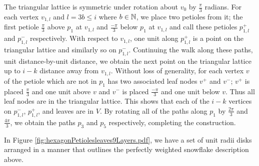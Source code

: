 The triangular lattice is symmetric under rotation about $v_0$ by $\frac{\pi}{3}$ radians.  
For each vertex $v_{1,l}$ and $l = 3 b \leq i$ where $b \in {\mathbb{N}}$, we place two petioles from it; the first petiole $\frac{\pi}{3}$ above $p_1$ at $v_{1,l}$ and $\frac{-\pi}{3}$ below $p_1$ at $v_{1,l}$ and call these petioles $p_{1,l}^+$ and $p_{1,l}^-$ respectively.  
With respect to $v_{1,l}$, one unit along $p_{1,l}^+$ is a point on the triangular lattice and similarly so on $p_{1,l}^-$.  
Continuing the walk along these paths, unit distance-by-unit distance, we obtain the next point on the triangular lattice up to $i-k$ distance away from $v_{1,l}$.  
Without loss of generality, for each vertex $v$ of the petiole which are not in $p_1$ has two associated leaf nodes $v^+$ and $v^-$; $v^+$ is placed $\frac{\pi}{3}$ and one unit above $v$ and $v^-$ is placed $\frac{-\pi}{3}$ and one unit below $v$.  
Thus all leaf nodes are in the triangular lattice.
This shows that each of the $i-k$ vertices on $p_{1,l}^-$, $p_{1,l}^+$, and leaves are in $V$.
By rotating all of the paths along $p_1$ by $\frac{2\pi}{3}$ and $\frac{4\pi}{3}$, we obtain the paths $p_3$ and $p_5$ respectively, completing the construction.

In Figure \ref{fig:hexagonPetiolesleaves9Layers.pdf}, we have a set of unit radii disks arranged in a manner that outlines the perfectly weighted snowflake description above.
